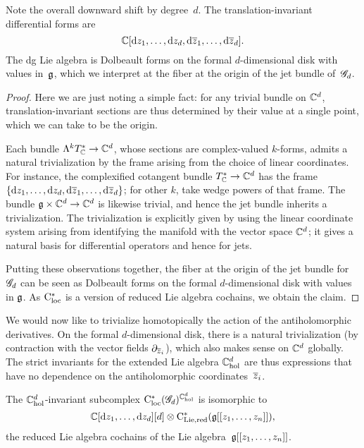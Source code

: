 Note the overall downward shift by degree~$d$.
The translation-invariant differential forms are
\[
\mathbb C[{\rm d} z_1,\ldots, {\rm d} z_d, {\rm d} \overline{z}_1,\ldots, {\rm d} \overline{z}_d].
\] 
The dg Lie algebra is Dolbeault forms on the formal $d$-dimensional disk with values in~$\mathfrak g$,
which we interpret at the fiber at the origin of the jet bundle of~$\mathscr G_d$.


\begin{proof}
Here we are just noting a simple fact: 
for any trivial bundle on $\mathbb C^d$, 
translation-invariant sections are thus determined by their value at a single point,
which we can take to be the origin.

Each bundle $\Lambda^k T_\mathbb C^* \to \mathbb C^d$, whose sections are complex-valued $k$-forms, admits a natural trivialization by the frame arising from the choice of linear coordinates. 
For instance, the complexified cotangent bundle $T^*_\mathbb C \to \mathbb C^d$ has the frame $\{{\rm d} z_1,\ldots,{\rm d} z_d, {\rm d} \overline{z}_1,\ldots,{\rm d} \overline{z}_d\}$; for other $k$, take wedge powers of that frame. 
The bundle $\mathfrak g \times \mathbb C^d \to \mathbb C^d$ is likewise trivial,
and hence the jet bundle inherits a trivialization.
The trivialization is explicitly given by using the linear coordinate system arising from identifying the manifold with the vector space $\mathbb C^d$;
it gives a natural basis for differential operators and hence for jets.

Putting these observations together, 
the fiber at the origin of the jet bundle for $\mathscr G_d$ can be seen as Dolbeault forms on the formal $d$-dimensional disk with values in $\mathfrak g$.
As ${\rm C}_{\rm loc}^*$ is a version of reduced Lie algebra cochains, we obtain the claim.
\end{proof}

We would now like to trivialize homotopically the action of the antiholomorphic derivatives.
On the formal $d$-dimensional disk, there is a natural trivialization (by contraction with the vector fields $\partial_{\overline{z}_i}$),
which also makes sense on $\mathbb C^d$ globally.
The strict invariants for the extended Lie algebra $\mathbb C^d_{\rm hol}$ are thus expressions that have no dependence on the antiholomorphic coordinates~$\overline{z}_i$.

\begin{lem}
The $\mathbb C^d_{\rm hol}$-invariant subcomplex ${\rm C}_{\rm loc}^*(\mathscr G_d)^{\mathbb C^d_{\rm hol}}$ is isomorphic to 
\[
\mathbb C[{\rm d} z_1,\ldots, {\rm d} z_d][d] \otimes {\rm C}_{\rm Lie, red}^*(\mathfrak g[[z_1,\ldots,z_n]]),
\]
the reduced Lie algebra cochains of the Lie algebra~$\mathfrak g[[z_1,\ldots,z_n]]$.
\end{lem}

